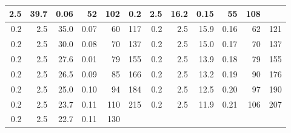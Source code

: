 \begin{table}[H]
{\begin{tabular}{|rrrrrr||rrrrrr|}
  \multicolumn{1}{r|}{2.5} &
  \multicolumn{1}{r|}{39.7} &
  \multicolumn{1}{r|}{0.06} &
  \multicolumn{1}{r|}{52} &
  102 &
  \multicolumn{1}{r|}{0.2} &
  \multicolumn{1}{r|}{2.5} &
  \multicolumn{1}{r|}{16.2} &
  \multicolumn{1}{r|}{0.15} &
  \multicolumn{1}{r|}{55} &
  108 \\ \hline
\multicolumn{1}{|r|}{0.2} &
  \multicolumn{1}{r|}{2.5} &
  \multicolumn{1}{r|}{35.0} &
  \multicolumn{1}{r|}{0.07} &
  \multicolumn{1}{r|}{60} &
  117 &
  \multicolumn{1}{r|}{0.2} &
  \multicolumn{1}{r|}{2.5} &
  \multicolumn{1}{r|}{15.9} &
  \multicolumn{1}{r|}{0.16} &
  \multicolumn{1}{r|}{62} &
  121 \\ \hline
\multicolumn{1}{|r|}{0.2} &
  \multicolumn{1}{r|}{2.5} &
  \multicolumn{1}{r|}{30.0} &
  \multicolumn{1}{r|}{0.08} &
  \multicolumn{1}{r|}{70} &
  137 &
  \multicolumn{1}{r|}{0.2} &
  \multicolumn{1}{r|}{2.5} &
  \multicolumn{1}{r|}{15.0} &
  \multicolumn{1}{r|}{0.17} &
  \multicolumn{1}{r|}{70} &
  137 \\ \hline
\multicolumn{1}{|r|}{0.2} &
  \multicolumn{1}{r|}{2.5} &
  \multicolumn{1}{r|}{27.6} &
  \multicolumn{1}{r|}{0.01} &
  \multicolumn{1}{r|}{79} &
  155 &
  \multicolumn{1}{r|}{0.2} &
  \multicolumn{1}{r|}{2.5} &
  \multicolumn{1}{r|}{13.9} &
  \multicolumn{1}{r|}{0.18} &
  \multicolumn{1}{r|}{79} &
  155 \\ \hline
\multicolumn{1}{|r|}{0.2} &
  \multicolumn{1}{r|}{2.5} &
  \multicolumn{1}{r|}{26.5} &
  \multicolumn{1}{r|}{0.09} &
  \multicolumn{1}{r|}{85} &
  166 &
  \multicolumn{1}{r|}{0.2} &
  \multicolumn{1}{r|}{2.5} &
  \multicolumn{1}{r|}{13.2} &
  \multicolumn{1}{r|}{0.19} &
  \multicolumn{1}{r|}{90} &
  176 \\ \hline
\multicolumn{1}{|r|}{0.2} &
  \multicolumn{1}{r|}{2.5} &
  \multicolumn{1}{r|}{25.0} &
  \multicolumn{1}{r|}{0.10} &
  \multicolumn{1}{r|}{94} &
  184 &
  \multicolumn{1}{r|}{0.2} &
  \multicolumn{1}{r|}{2.5} &
  \multicolumn{1}{r|}{12.5} &
  \multicolumn{1}{r|}{0.20} &
  \multicolumn{1}{r|}{97} &
  190 \\ \hline
\multicolumn{1}{|r|}{0.2} &
  \multicolumn{1}{r|}{2.5} &
  \multicolumn{1}{r|}{23.7} &
  \multicolumn{1}{r|}{0.11} &
  \multicolumn{1}{r|}{110} &
  215 &
  \multicolumn{1}{r|}{0.2} &
  \multicolumn{1}{r|}{2.5} &
  \multicolumn{1}{r|}{11.9} &
  \multicolumn{1}{r|}{0.21} &
  \multicolumn{1}{r|}{106} &
  207 \\ \hline
\multicolumn{1}{|r|}{0.2} &
  \multicolumn{1}{r|}{2.5} &
  \multicolumn{1}{r|}{22.7} &
  \multicolumn{1}{r|}{0.11} &
  \multicolumn{1}{r|}{130} &

\end{tabular}}
\end{table}
